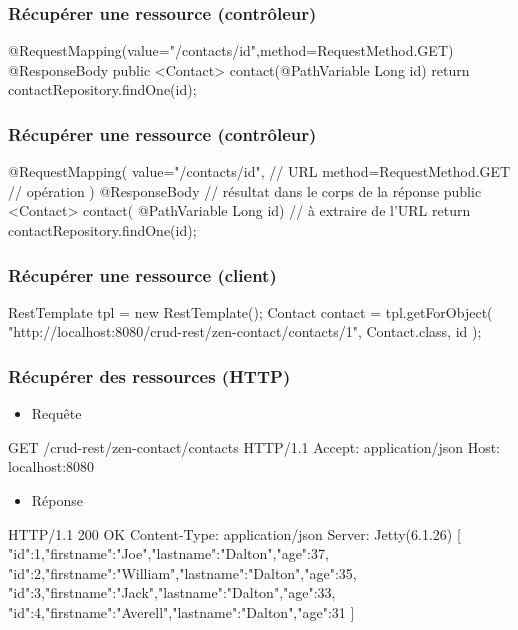 \begin{frame}[fragile]
 \frametitle{Récupérer une ressource (contrôleur)}
 
 \begin{javacode}
@RequestMapping(value="/contacts/{id}",method=RequestMethod.GET)   
@ResponseBody                 
public <Contact> contact(@PathVariable Long id) {  
  return contactRepository.findOne(id);
}
 \end{javacode}  

\end{frame}

\begin{frame}[fragile]
 \frametitle{Récupérer une ressource (contrôleur)}
 
 \begin{javacode}
@RequestMapping(
  value="/contacts/{id}",     // URL
  method=RequestMethod.GET    // op\'eration
)
@ResponseBody                 // r\'esultat dans le corps de la r\'eponse
public <Contact> contact(
    @PathVariable Long id) {  // \`a extraire de l'URL
  return contactRepository.findOne(id);
}
 \end{javacode}  

\end{frame}

\begin{frame}[fragile]
 \frametitle{Récupérer une ressource (client)}
 
 \begin{javacode}
RestTemplate tpl = new RestTemplate();
Contact contact = tpl.getForObject(
  "http://localhost:8080/crud-rest/zen-contact/contacts/1", 
  Contact.class,
  id
);
 \end{javacode}  

\end{frame}

\begin{frame}[fragile]
 \frametitle{Récupérer des ressources (HTTP)}
 
 \begin{itemize}
  \item Requête
 \end{itemize} 
 
 \begin{textcode}
GET /crud-rest/zen-contact/contacts HTTP/1.1
Accept: application/json
Host: localhost:8080
 \end{textcode}
 
  \begin{itemize}
  \item Réponse
 \end{itemize} 
 
 \begin{textcode}
HTTP/1.1 200 OK
Content-Type: application/json
Server: Jetty(6.1.26)
[
 {"id":1,"firstname":"Joe","lastname":"Dalton","age":37},
 {"id":2,"firstname":"William","lastname":"Dalton","age":35},
 {"id":3,"firstname":"Jack","lastname":"Dalton","age":33},
 {"id":4,"firstname":"Averell","lastname":"Dalton","age":31}
]
 \end{textcode}

\end{frame}

